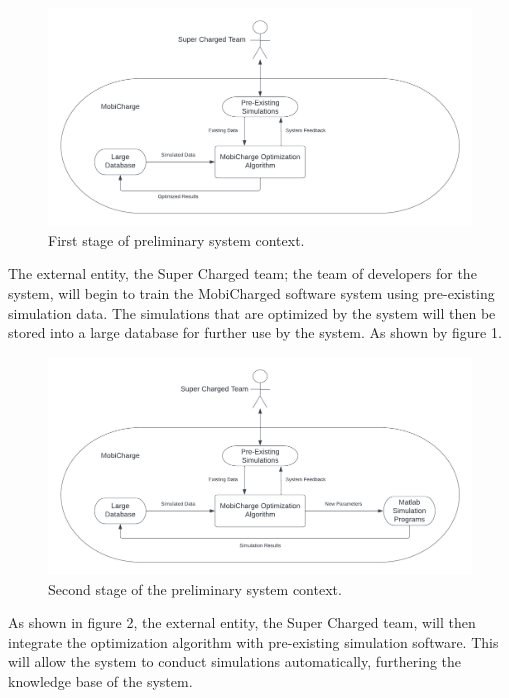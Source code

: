 \documentclass[12pt, titlepage]{article}
\begin{document}
\begin{figure}[h]
    \centering
    \includegraphics[width=15cm]{images/context0.png}
    \caption[Prelim System Contexts 1]{First stage of preliminary system context.}
    \label{fig:figure1}
\end{figure}

The external entity, the Super Charged team; the team of developers for the system, will begin to train the MobiCharged software system using pre-existing simulation data. The simulations that are optimized by the system will then be stored into a large database for further use by the system. As shown by figure 1.
\par
\newpage
\begin{figure}[h]
    \centering
    \includegraphics[width=15cm]{images/context1.png}
    \caption[Prelim System Contexts 2]{Second stage of the preliminary system context.}
    \label{fig:figure2}
\end{figure}
As shown in figure 2, the external entity, the Super Charged team, will then integrate the optimization algorithm with pre-existing simulation software. This will allow the system to conduct simulations automatically, furthering the knowledge base of the system. 
\end{document}
